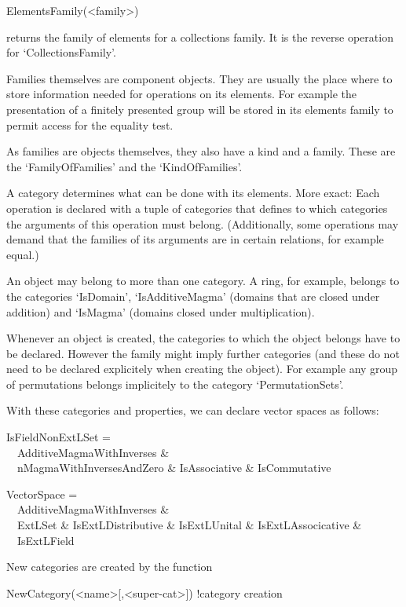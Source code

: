 \>ElementsFamily(<family>)

returns the family of elements for a collections family. It is the reverse
operation for `CollectionsFamily'.

\danger
\label{storeinfamily}
Families themselves are component objects. They are usually the place where
to store
information needed for operations on its elements. For example the
presentation of a finitely presented group will be stored in its elements
family to permit access for the equality test.

\danger
As families are objects themselves, they also have a kind and a family.
These are the `FamilyOfFamilies' and the `KindOfFamilies'.


A category determines what can be done with its elements. More exact: Each
operation is declared with a tuple of categories that defines to which
categories the arguments of this operation must belong. (Additionally, some
operations may demand that the families of its arguments are in certain
relations, for example equal.)

An object may belong to more than one category. A ring, for example, belongs
to the categories `IsDomain', `IsAdditiveMagma' (domains that are closed under
addition) and `IsMagma' (domains closed under multiplication).

\danger
Whenever an object is created, the categories to which the object belongs
have to be declared. However the family might imply further categories (and
these do not need to be declared explicitely when creating the object).
For example any
group of permutations belongs implicitely to the category `PermutationSets'.


With these categories and properties, we can declare vector spaces as
follows:

IsFieldNonExtLSet = \\
\ \ AdditiveMagmaWithInverses \& \\
\ \ nMagmaWithInversesAndZero \& IsAssociative \& IsCommutative

VectorSpace = \\
\ \ AdditiveMagmaWithInverses \& \\
\ \ ExtLSet \& IsExtLDistributive \& IsExtLUnital \& IsExtLAssocicative \& \\
\ \ IsExtLField

New categories are created by the function

\> NewCategory(<name>[,<super-cat>]) !{category creation}

